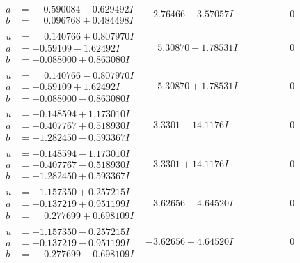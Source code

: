 \documentclass[1p]{elsarticle_modified}
\theoremstyle{definition}
\begin{document}
$$\begin{array}{c|c|c}
\begin{aligned}
a &= \phantom{-}0.590084 - 0.629492 I \\
b &= \phantom{-}0.096768 + 0.484498 I\end{aligned}
 & -2.76466 + 3.57057 I & \phantom{-0.000000 } 0 \\ \hline\begin{aligned}
u &= \phantom{-}0.140766 + 0.807970 I \\
a &= -0.59109 - 1.62492 I \\
b &= -0.088000 + 0.863080 I\end{aligned}
 & \phantom{-}5.30870 - 1.78531 I & \phantom{-0.000000 } 0 \\ \hline\begin{aligned}
u &= \phantom{-}0.140766 - 0.807970 I \\
a &= -0.59109 + 1.62492 I \\
b &= -0.088000 - 0.863080 I\end{aligned}
 & \phantom{-}5.30870 + 1.78531 I & \phantom{-0.000000 } 0 \\ \hline\begin{aligned}
u &= -0.148594 + 1.173010 I \\
a &= -0.407767 + 0.518930 I \\
b &= -1.282450 - 0.593367 I\end{aligned}
 & -3.3301 - 14.1176 I & \phantom{-0.000000 } 0 \\ \hline\begin{aligned}
u &= -0.148594 - 1.173010 I \\
a &= -0.407767 - 0.518930 I \\
b &= -1.282450 + 0.593367 I\end{aligned}
 & -3.3301 + 14.1176 I & \phantom{-0.000000 } 0 \\ \hline\begin{aligned}
u &= -1.157350 + 0.257215 I \\
a &= -0.137219 + 0.951199 I \\
b &= \phantom{-}0.277699 + 0.698109 I\end{aligned}
 & -3.62656 + 4.64520 I & \phantom{-0.000000 } 0 \\ \hline\begin{aligned}
u &= -1.157350 - 0.257215 I \\
a &= -0.137219 - 0.951199 I \\
b &= \phantom{-}0.277699 - 0.698109 I\end{aligned}
 & -3.62656 - 4.64520 I & \phantom{-0.000000 } 0 \\ \hline\begin{aligned}

\end{aligned}
\end{array}$$
\end{document}
